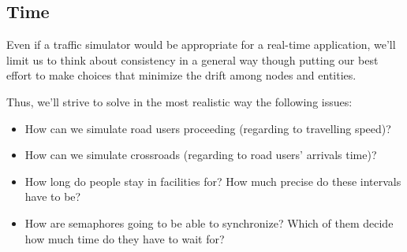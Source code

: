 \subsection{Time}
Even if a traffic simulator would be appropriate for a real-time application,
we'll limit us to think about consistency in a general way though putting our
best effort to make choices that minimize the drift among nodes and entities.

Thus, we'll strive to solve in the most realistic way the following issues:

\begin{itemize}
\item How can we simulate road users proceeding (regarding to travelling
  speed)?
\item How can we simulate crossroads (regarding to road users' arrivals time)?
\item How long do people stay in facilities for? How much precise do these
  intervals have to be?
\item How are semaphores going to be able to synchronize? Which of them decide
  how much time do they have to wait for?
\end{itemize}
